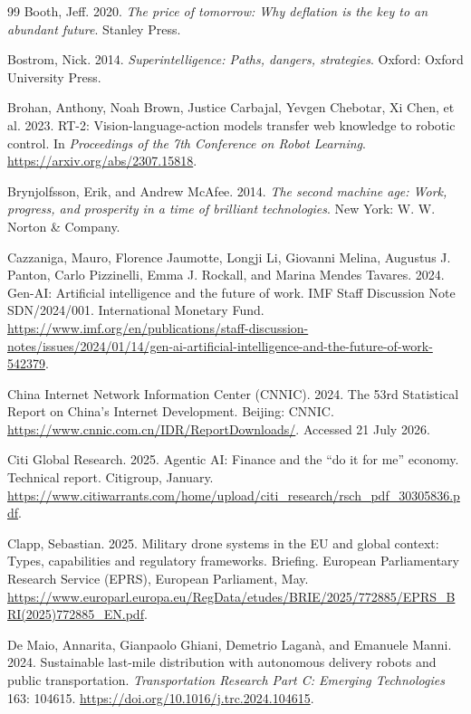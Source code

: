 \documentclass[11pt]{article}
\begin{document}
\begin{thebibliography}{99}
Booth, Jeff. 2020. \textit{The price of tomorrow: Why deflation is the key to an abundant future}. Stanley Press.

Bostrom, Nick. 2014. \textit{Superintelligence: Paths, dangers, strategies}. Oxford: Oxford University Press.

Brohan, Anthony, Noah Brown, Justice Carbajal, Yevgen Chebotar, Xi Chen, et al. 2023. RT-2: Vision-language-action models transfer web knowledge to robotic control. In \textit{Proceedings of the 7th Conference on Robot Learning}. \url{https://arxiv.org/abs/2307.15818}.

Brynjolfsson, Erik, and Andrew McAfee. 2014. \textit{The second machine age: Work, progress, and prosperity in a time of brilliant technologies}. New York: W. W. Norton \& Company.

Cazzaniga, Mauro, Florence Jaumotte, Longji Li, Giovanni Melina, Augustus J. Panton, Carlo Pizzinelli, Emma J. Rockall, and Marina Mendes Tavares. 2024. Gen-AI: Artificial intelligence and the future of work. IMF Staff Discussion Note SDN/2024/001. International Monetary Fund. \url{https://www.imf.org/en/publications/staff-discussion-notes/issues/2024/01/14/gen-ai-artificial-intelligence-and-the-future-of-work-542379}.

China Internet Network Information Center (CNNIC). 2024. The 53rd Statistical Report on China's Internet Development. Beijing: CNNIC. \url{https://www.cnnic.com.cn/IDR/ReportDownloads/}. Accessed 21 July 2026.

Citi Global Research. 2025. Agentic AI: Finance and the ``do it for me'' economy. Technical report. Citigroup, January. \url{https://www.citiwarrants.com/home/upload/citi_research/rsch_pdf_30305836.pdf}.

Clapp, Sebastian. 2025. Military drone systems in the EU and global context: Types, capabilities and regulatory frameworks. Briefing. European Parliamentary Research Service (EPRS), European Parliament, May. \url{https://www.europarl.europa.eu/RegData/etudes/BRIE/2025/772885/EPRS_BRI(2025)772885_EN.pdf}.

De Maio, Annarita, Gianpaolo Ghiani, Demetrio Lagan\`a, and Emanuele Manni. 2024. Sustainable last-mile distribution with autonomous delivery robots and public transportation. \textit{Transportation Research Part C: Emerging Technologies} 163: 104615. \url{https://doi.org/10.1016/j.trc.2024.104615}.


\end{thebibliography}
\end{document}
